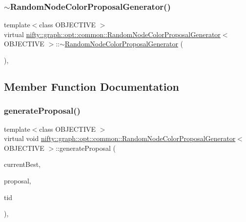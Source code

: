 \subsubsection{\texorpdfstring{$\sim$\+Random\+Node\+Color\+Proposal\+Generator()}{~RandomNodeColorProposalGenerator()}}
{\footnotesize\ttfamily template$<$class O\+B\+J\+E\+C\+T\+I\+VE $>$ \\
virtual \hyperlink{classnifty_1_1graph_1_1opt_1_1common_1_1RandomNodeColorProposalGenerator}{nifty\+::graph\+::opt\+::common\+::\+Random\+Node\+Color\+Proposal\+Generator}$<$ O\+B\+J\+E\+C\+T\+I\+VE $>$\+::$\sim$\hyperlink{classnifty_1_1graph_1_1opt_1_1common_1_1RandomNodeColorProposalGenerator}{Random\+Node\+Color\+Proposal\+Generator} (\begin{DoxyParamCaption}{ }\end{DoxyParamCaption})\hspace{0.3cm}{\ttfamily [inline]}, {\ttfamily [virtual]}}



\subsection{Member Function Documentation}
\mbox{\label{classnifty_1_1graph_1_1opt_1_1common_1_1RandomNodeColorProposalGenerator_a5862fcb54e6f7332b6466ecc8371aef4}} 
\subsubsection{\texorpdfstring{generate\+Proposal()}{generateProposal()}}
{\footnotesize\ttfamily template$<$class O\+B\+J\+E\+C\+T\+I\+VE $>$ \\
virtual void \hyperlink{classnifty_1_1graph_1_1opt_1_1common_1_1RandomNodeColorProposalGenerator}{nifty\+::graph\+::opt\+::common\+::\+Random\+Node\+Color\+Proposal\+Generator}$<$ O\+B\+J\+E\+C\+T\+I\+VE $>$\+::generate\+Proposal (\begin{DoxyParamCaption}\item[{const \hyperlink{classnifty_1_1graph_1_1opt_1_1common_1_1ProposalGeneratorBase_a122993da5c326628cdb865a6279d20c5}{Proposal\+Type} \&}]{current\+Best,  }\item[{\hyperlink{classnifty_1_1graph_1_1opt_1_1common_1_1ProposalGeneratorBase_a122993da5c326628cdb865a6279d20c5}{Proposal\+Type} \&}]{proposal,  }\item[{const size\+\_\+t}]{tid }\end{DoxyParamCaption})\hspace{0.3cm}{\ttfamily [inline]}, {\ttfamily [virtual]}}



